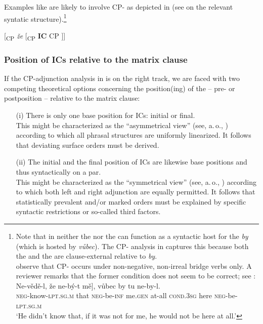 \documentclass[output=paper,colorlinks,citecolor=brown,newtxmath]{langsci/langscibook}
\begin{document}
\noindent Examples like  are likely to involve CP- as depicted in  (see \citealt{Kaspar2016} on the relevant syntatic structure).\footnote{Note that in  neither the  nor the  can function as a syntactic host for the  \textit{by} (which is hosted by \textit{vůbec}). The CP- analysis in  captures this because both the  and the  are clause-external relative to \textit{by}.\\ \citet{IatridouKroch1992} observe that CP- occurs under non-negative, non-irreal bridge verbs only. A reviewer remarks that the former condition does not seem to be correct; see :
\ea\label{ex:reviewer}
\gll Ne-vědě-l, že \minsp{[} ne-bý-t mě], vůbec by tu ne-by-l.\\
     \textsc{neg}-know-\textsc{lpt.sg.m} that {} \textsc{neg}-be-\textsc{inf} me.\textsc{gen} at-all \textsc{cond.3sg} here \textsc{neg}-be-\textsc{lpt.sg.m}\\
\glt `He didn't know that, if it was not for me, he would not be here at all.'
\z}

\ea\label{tree:CPdoubling}
{[\textsubscript{CP} \textit{že} [\textsubscript{CP} \textbf{IC} CP ]]}
\z


\subsubsection{Position of ICs relative to the matrix clause}\label{sec:syntax_external_position}

If the CP-adjunction analysis in  is on the right track, we are faced with two competing theoretical options concerning the position(ing) of the  -- pre- or postposition -- relative to the matrix clause:

\begin{itemize}

\item[(i)] There is only one base position for ICs: initial or final.\\ This might be characterized as the ``asymmetrical view'' (see, a.\,o., \citealt{kayne1994}) according to which all phrasal structures are uniformly linearized. It follows that deviating surface orders must be derived.

\item[(ii)] The initial and the final position of ICs are likewise base positions and thus syntactically on a par.\\ This might be characterized as the ``symmetrical view'' (see, a.\,o., \citealt{chomsky1986k,Chomsky2004}) according to which both left and right adjunction are equally permitted. It follows that statistically prevalent and/or marked orders must be explained by specific syntactic restrictions or so-called third factors.

\end{itemize}
\end{document}
